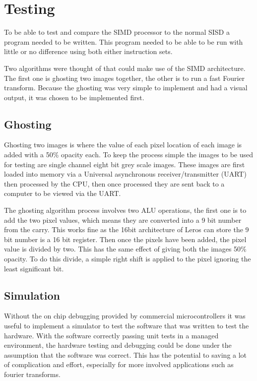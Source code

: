 \section{Testing}

To be able to test and compare the SIMD processor to the normal SISD a program
needed to be written. This program needed to be able to be run with little or no
difference using both either instruction sets.

Two algorithms were thought of that could make use of the SIMD architecture.
The first one is ghosting two images together, the other is to run a fast
Fourier transform. Because the ghosting was very simple to implement and had a
visual output, it was chosen to be implemented first.

\subsection{Ghosting}
  Ghosting two images is where the value of each pixel location of each image is
  added with a 50\% opacity each. To keep the process simple the images to be
  used for testing are single channel eight bit grey scale images. These images
  are first loaded into memory via a Universal asynchronous receiver/transmitter
  (UART) then processed by the CPU, then once processed they are sent back to a
  computer to be viewed via the UART.


  The ghosting algorithm process involves two ALU operations, the first one is
  to add the two pixel values, which means they are converted into a 9 bit
  number from the carry. This works fine as the 16bit architecture of Leros can
  store the 9 bit number is a 16 bit register. Then once the pixels have been
  added, the pixel value is divided by two. This has the same effect of giving
  both the images 50\% opacity. To do this divide, a simple right shift is
  applied to the pixel ignoring the least significant bit.

\subsection{Simulation}
 Without the on chip debugging provided by commercial microcontrollers it was
 useful to implement a simulator to test the software that was written to test
 the hardware. With the software correctly passing unit tests in a managed
 environment, the hardware testing and debugging could be done under the
 assumption that the software was correct. This has the potential to saving a lot
 of complication and effort, especially for more involved applications such as
 fourier transforms.

